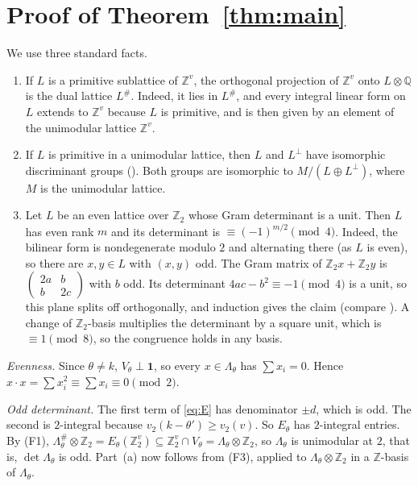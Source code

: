 \documentclass[11pt]{amsart}
\theoremstyle{remark}
\newcommand{\Z}{\mathbb{Z}}
\newcommand{\Q}{\mathbb{Q}}
\begin{document}
\section{Proof of Theorem~\ref{thm:main}}
We use three standard facts.
\begin{enumerate}
\item[(F1)] If $L$ is a primitive sublattice of $\Z^v$, the orthogonal projection of $\Z^v$ onto $L\otimes\Q$ is
the dual lattice $L^\#$. Indeed, it lies in $L^\#$, and every integral linear form on $L$ extends to $\Z^v$ because
$L$ is primitive, and is then given by an element of the unimodular lattice $\Z^v$.
\item[(F2)] If $L$ is primitive in a unimodular lattice, then $L$ and $L^\perp$ have isomorphic discriminant groups
(\cite[Prop.~1.6.1]{Nik}). Both groups are isomorphic to $M/(L\oplus L^\perp)$, where $M$ is the unimodular lattice.
\item[(F3)] Let $L$ be an even lattice over $\Z_2$ whose Gram determinant is a unit. Then $L$ has even rank $m$ and its determinant is $\equiv(-1)^{m/2}\pmod 4$. Indeed, the bilinear form is nondegenerate modulo $2$ and alternating there (as $L$ is even), so there are $x,y\in L$ with $(x,y)$ odd. The Gram matrix of $\Z_2x+\Z_2y$ is $\begin{pmatrix}2a&b\\ b&2c\end{pmatrix}$ with $b$ odd. Its determinant $4ac-b^2\equiv-1\pmod 4$ is a unit, so this plane splits off orthogonally, and induction gives the claim (compare \cite[Ch.~15]{CS}). A change of $\Z_2$-basis multiplies the determinant by a square unit, which is $\equiv1\pmod8$, so the congruence holds in any basis.
\end{enumerate}

\emph{Evenness.} Since $\theta\ne k$, $V_\theta\perp\mathbf 1$, so every $x\in\Lambda_\theta$ has
$\sum x_i=0$. Hence $x\cdot x=\sum x_i^2\equiv\sum x_i\equiv0\pmod 2$.

\emph{Odd determinant.} The first term of \eqref{eq:E} has denominator $\pm d$, which is odd. The second is $2$-integral
because $v_2(k-\theta')\ge v_2(v)$. So $E_\theta$ has $2$-integral entries. By (F1),
$\Lambda_\theta^\#\otimes\Z_2=E_\theta(\Z_2^v)\subseteq \Z_2^v\cap V_\theta=\Lambda_\theta\otimes\Z_2$, so
$\Lambda_\theta$ is unimodular at $2$, that is, $\det\Lambda_\theta$ is odd. Part~(a) now follows from (F3), applied to $\Lambda_\theta\otimes\Z_2$ in a $\Z$-basis of $\Lambda_\theta$.
\end{document}
